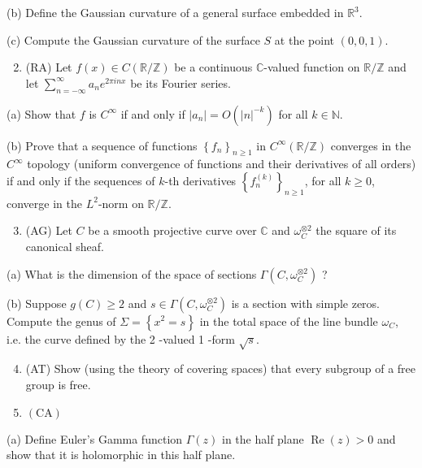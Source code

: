 \documentclass[10pt]{article}
\begin{document}
(b) Define the Gaussian curvature of a general surface embedded in $\mathbb{R}^{3}$.

(c) Compute the Gaussian curvature of the surface $S$ at the point $(0,0,1)$.

\begin{enumerate}
  \setcounter{enumi}{1}
  \item (RA) Let $f(x) \in C(\mathbb{R} / \mathbb{Z})$ be a continuous $\mathbb{C}$-valued function on $\mathbb{R} / \mathbb{Z}$ and let $\sum_{n=-\infty}^{\infty} a_{n} e^{2 \pi i n x}$ be its Fourier series.
\end{enumerate}

(a) Show that $f$ is $C^{\infty}$ if and only if $\left|a_{n}\right|=O\left(|n|^{-k}\right)$ for all $k \in \mathbb{N}$.

(b) Prove that a sequence of functions $\left\{f_{n}\right\}_{n \geq 1}$ in $C^{\infty}(\mathbb{R} / \mathbb{Z})$ converges in the $C^{\infty}$ topology (uniform convergence of functions and their derivatives of all orders) if and only if the sequences of $k$-th derivatives $\left\{f_{n}^{(k)}\right\}_{n \geq 1}$, for all $k \geq 0$, converge in the $L^{2}$-norm on $\mathbb{R} / \mathbb{Z}$.

\begin{enumerate}
  \setcounter{enumi}{2}
  \item (AG) Let $C$ be a smooth projective curve over $\mathbb{C}$ and $\omega_{C}^{\otimes 2}$ the square of its canonical sheaf.
\end{enumerate}

(a) What is the dimension of the space of sections $\Gamma\left(C, \omega_{C}^{\otimes 2}\right)$ ?

(b) Suppose $g(C) \geq 2$ and $s \in \Gamma\left(C, \omega_{C}^{\otimes 2}\right)$ is a section with simple zeros. Compute the genus of $\Sigma=\left\{x^{2}=s\right\}$ in the total space of the line bundle $\omega_{C}$, i.e. the curve defined by the 2 -valued 1 -form $\sqrt{s}$.

\begin{enumerate}
  \setcounter{enumi}{3}
  \item (AT) Show (using the theory of covering spaces) that every subgroup of a free group is free.

  \item $(\mathrm{CA})$

\end{enumerate}

(a) Define Euler's Gamma function $\Gamma(z)$ in the half plane $\operatorname{Re}(z)>0$ and show that it is holomorphic in this half plane.
\end{document}
